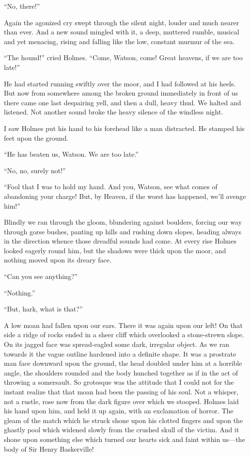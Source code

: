 \documentclass[paper=5.5in:8.5in,BCOR=7mm,twoside,DIV=calc,12pt,usegeometry,openany,chapterprefix,endperiod]{scrbook} %
\begin{document}
\enquote{No, there!}

Again the agonized cry swept through the silent night, louder and much nearer than ever. And a new sound mingled with it, a deep, muttered rumble, musical and yet menacing, rising and falling like the low, constant murmur of the sea.

\enquote{The hound!} cried Holmes. \enquote{Come, Watson, come! Great heavens, if we are too late!}

He had started running swiftly over the moor, and I had followed at his heels. But now from somewhere among the broken ground immediately in front of us there came one last despairing yell, and then a dull, heavy thud. We halted and listened. Not another sound broke the heavy silence of the windless night.

I saw Holmes put his hand to his forehead like a man distracted. He stamped his feet upon the ground.

\enquote{He has beaten us, Watson. We are too late.}

\enquote{No, no, surely not!}

\enquote{Fool that I was to hold my hand. And you, Watson, see what comes of abandoning your charge! But, by Heaven, if the worst has happened, we'll avenge him!}

Blindly we ran through the gloom, blundering against boulders, forcing our way through gorse bushes, panting up hills and rushing down slopes, heading always in the direction whence those dreadful sounds had come. At every rise Holmes looked eagerly round him, but the shadows were thick upon the moor, and nothing moved upon its dreary face.

\enquote{Can you see anything?}

\enquote{Nothing.}

\enquote{But, hark, what is that?}


A low moan had fallen upon our ears. There it was again upon our left! On that side a ridge of rocks ended in a sheer cliff which overlooked a stone-strewn slope. On its jagged face was spread-eagled some dark, irregular object. As we ran towards it the vague outline hardened into a definite shape. It was a prostrate man face downward upon the ground, the head doubled under him at a horrible angle, the shoulders rounded and the body hunched together as if in the act of throwing a somersault. So grotesque was the attitude that I could not for the instant realize that that moan had been the passing of his soul. Not a whisper, not a rustle, rose now from the dark figure over which we stooped. Holmes laid his hand upon him, and held it up again, with an exclamation of horror. The gleam of the match which he struck shone upon his clotted fingers and upon the ghastly pool which widened slowly from the crushed skull of the victim. And it shone upon something else which turned our hearts sick and faint within us\nobreakdash---the body of Sir Henry Baskerville!
\end{document}
